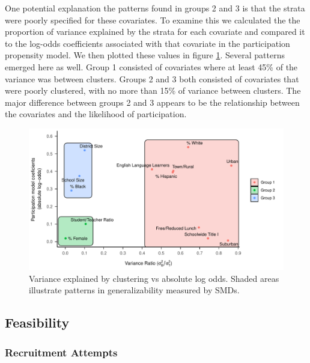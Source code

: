 \documentclass[english,man,floatsintext]{apa6}
\begin{document}
One potential explanation the patterns found in groups 2 and 3 is that the strata were poorly specified for these covariates. To examine this we calculated the the proportion of variance explained by the strata for each covariate and compared it to the log-odds coefficients associated with that covariate in the participation propensity model. We then plotted these values in figure \ref{fig:fig-Var-Coef}. Several patterns emerged here as well. Group 1 consisted of covariates where at least 45\% of the variance was between clusters. Groups 2 and 3 both consisted of covariates that were poorly clustered, with no more than 15\% of variance between clusters. The major difference between groups 2 and 3 appears to be the relationship between the covariates and the likelihood of participation.



\begin{figure}
\centering
\includegraphics{6---Paper_files/figure-latex/fig-Var-Coef-1.pdf}
\caption{\label{fig:fig-Var-Coef}Variance explained by clustering vs absolute log odds. Shaded areas illustrate patterns in generalizability measured by SMDs.}
\end{figure}

\hypertarget{feasibility-1}{%
\subsection{Feasibility}\label{feasibility-1}}

\hypertarget{recruitment-attempts}{%
\subsubsection{Recruitment Attempts}\label{recruitment-attempts}}
\end{document}
